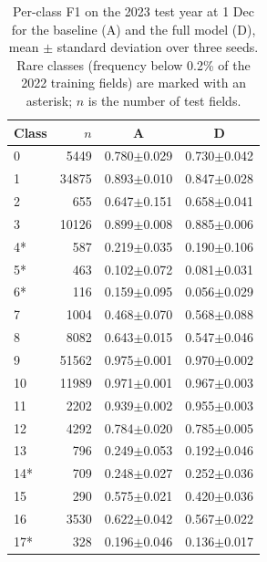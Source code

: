 \begin{table}[t]
\caption{Per-class F1 on the 2023 test year at 1 Dec for the baseline (A) and the full model (D), mean $\pm$ standard deviation over three seeds. Rare classes (frequency below 0.2\% of the 2022 training fields) are marked with an asterisk; $n$ is the number of test fields.}
\label{tab:per_class}
\centering
\footnotesize
\begin{tabular}{lrcc}
\hline
Class & $n$ & A & D \\
\hline
0 & 5449 & 0.780$\pm$0.029 & 0.730$\pm$0.042 \\
1 & 34875 & 0.893$\pm$0.010 & 0.847$\pm$0.028 \\
2 & 655 & 0.647$\pm$0.151 & 0.658$\pm$0.041 \\
3 & 10126 & 0.899$\pm$0.008 & 0.885$\pm$0.006 \\
4* & 587 & 0.219$\pm$0.035 & 0.190$\pm$0.106 \\
5* & 463 & 0.102$\pm$0.072 & 0.081$\pm$0.031 \\
6* & 116 & 0.159$\pm$0.095 & 0.056$\pm$0.029 \\
7 & 1004 & 0.468$\pm$0.070 & 0.568$\pm$0.088 \\
8 & 8082 & 0.643$\pm$0.015 & 0.547$\pm$0.046 \\
9 & 51562 & 0.975$\pm$0.001 & 0.970$\pm$0.002 \\
10 & 11989 & 0.971$\pm$0.001 & 0.967$\pm$0.003 \\
11 & 2202 & 0.939$\pm$0.002 & 0.955$\pm$0.003 \\
12 & 4292 & 0.784$\pm$0.020 & 0.785$\pm$0.005 \\
13 & 796 & 0.249$\pm$0.053 & 0.192$\pm$0.046 \\
14* & 709 & 0.248$\pm$0.027 & 0.252$\pm$0.036 \\
15 & 290 & 0.575$\pm$0.021 & 0.420$\pm$0.036 \\
16 & 3530 & 0.622$\pm$0.042 & 0.567$\pm$0.022 \\
17* & 328 & 0.196$\pm$0.046 & 0.136$\pm$0.017 \\
\hline
\end{tabular}
\end{table}
